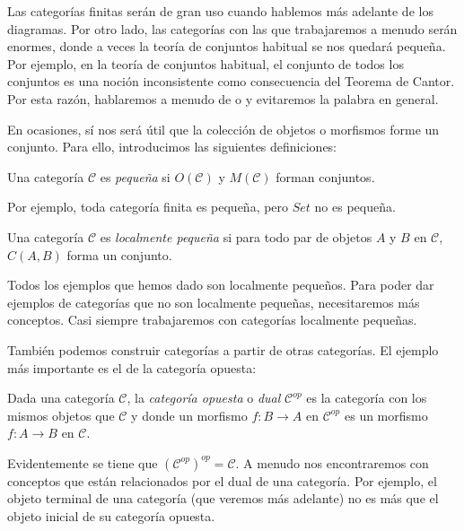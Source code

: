 \documentclass[12pt, twoside]{book}
\newcommand{\cat}{{\mathcal{C}}}
\newcommand{\Set}{{Set}}
\begin{document}
Las categorías finitas serán de gran uso cuando hablemos más adelante de los diagramas.
Por otro lado, las categorías con las que trabajaremos a menudo serán enormes, donde a veces la teoría de conjuntos habitual se nos quedará pequeña.
Por ejemplo, en la teoría de conjuntos habitual, el conjunto de todos los conjuntos es una noción inconsistente como consecuencia del Teorema de Cantor.
Por esta razón, hablaremos a menudo de  o  y evitaremos la palabra  en general.

En ocasiones, sí nos será útil que la colección de objetos o morfismos forme un conjunto.
Para ello, introducimos las siguientes definiciones:

\begin{definition}
Una categoría $\cat$ es \emph{pequeña} si $O(\cat)$ y $M(\cat)$ forman conjuntos.
\end{definition}

Por ejemplo, toda categoría finita es pequeña, pero $\Set$ no es pequeña.

\begin{definition}
Una categoría $\cat$ es \emph{localmente pequeña} si para todo par de objetos $A$ y $B$ en $\cat$, $C(A,B)$ forma un conjunto.
\end{definition}

Todos los ejemplos que hemos dado son localmente pequeños.
Para poder dar ejemplos de categorías que no son localmente pequeñas, necesitaremos más conceptos.
Casi siempre trabajaremos con categorías localmente pequeñas.

También podemos construir categorías a partir de otras categorías.
El ejemplo más importante es el de la categoría opuesta:
\begin{definition}
Dada una categoría $\cat$, la \emph{categoría opuesta} o \emph{dual} $\cat^{op}$ es la categoría con los mismos objetos que $\cat$ y donde un morfismo $f \colon B \to A$ en $\cat^{op}$ es un morfismo $f \colon A \to B$ en $\cat$.
\end{definition}

Evidentemente se tiene que $\left(\cat^{op}\right)^{op} = \cat$.
A menudo nos encontraremos con conceptos que están relacionados por el dual de una categoría.
Por ejemplo, el objeto terminal de una categoría (que veremos más adelante) no es más que el objeto inicial de su categoría opuesta.
\end{document}

